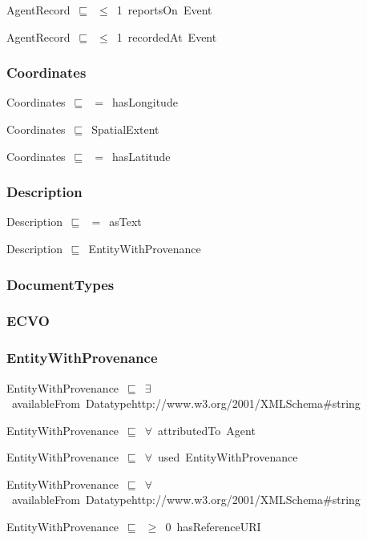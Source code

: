 \documentclass{article}
\begin{document}
AgentRecord~\ensuremath{\sqsubseteq}~\ensuremath{\leq}~1~reportsOn~Event~

AgentRecord~\ensuremath{\sqsubseteq}~\ensuremath{\leq}~1~recordedAt~Event~

\subsubsection*{Coordinates}

Coordinates~\ensuremath{\sqsubseteq}~\ensuremath{=}~hasLongitude~

Coordinates~\ensuremath{\sqsubseteq}~SpatialExtent~

Coordinates~\ensuremath{\sqsubseteq}~\ensuremath{=}~hasLatitude~

\subsubsection*{Description}

Description~\ensuremath{\sqsubseteq}~\ensuremath{=}~asText~

Description~\ensuremath{\sqsubseteq}~EntityWithProvenance~

\subsubsection*{DocumentTypes}

\subsubsection*{ECVO}

\subsubsection*{EntityWithProvenance}

EntityWithProvenance~\ensuremath{\sqsubseteq}~\ensuremath{\exists}~availableFrom~Datatypehttp://www.w3.org/2001/XMLSchema#string~

EntityWithProvenance~\ensuremath{\sqsubseteq}~\ensuremath{\forall}~attributedTo~Agent~

EntityWithProvenance~\ensuremath{\sqsubseteq}~\ensuremath{\forall}~used~EntityWithProvenance~

EntityWithProvenance~\ensuremath{\sqsubseteq}~\ensuremath{\forall}~availableFrom~Datatypehttp://www.w3.org/2001/XMLSchema#string~

EntityWithProvenance~\ensuremath{\sqsubseteq}~\ensuremath{\geq}~0~hasReferenceURI~
\end{document}
